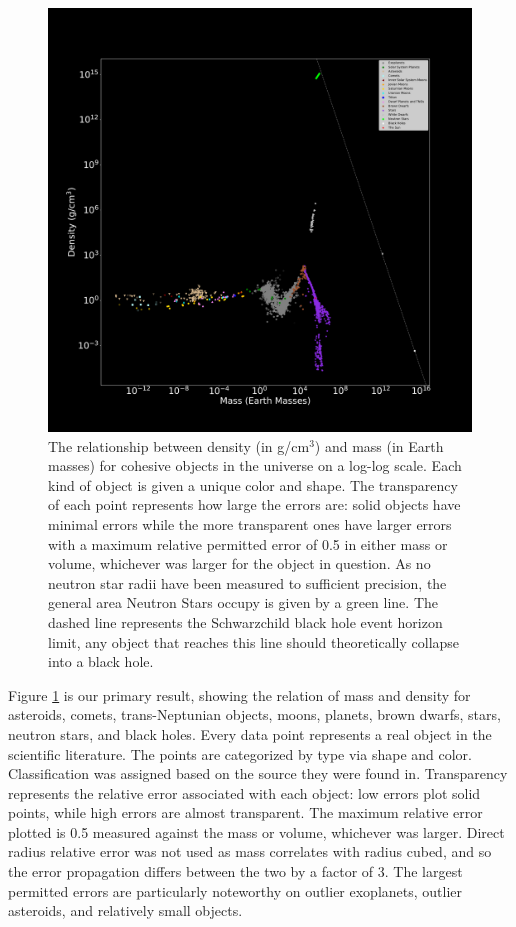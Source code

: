 \documentclass[twocolumn,linenumbers]{aastex631}
\begin{document}
\begin{figure}[htbp]
\centering
\includegraphics[scale = 0.35]{MassDensityPlot.pdf}
\centering
\caption{The relationship between density (in g/cm$^3$) and mass (in Earth masses) for cohesive objects in the universe on a log-log scale. Each kind of object is given a unique color and shape. The transparency of each point represents how large the errors are: solid objects have minimal errors while the more transparent ones have larger errors with a maximum relative permitted error of 0.5 in either mass or volume, whichever was larger for the object in question. As no neutron star radii have been measured to sufficient precision, the general area Neutron Stars occupy is given by a green line. The dashed line represents the Schwarzchild black hole event horizon limit, any object that reaches this line should theoretically collapse into a black hole.}
\label{fig:1}
\end{figure}

Figure \ref{fig:1} is our primary result, showing the relation of mass and density for asteroids, comets, trans-Neptunian objects, moons, planets, brown dwarfs, stars, neutron stars, and black holes. Every data point represents a real object in the scientific literature. The points are categorized by type via shape and color. Classification was assigned based on the source they were found in. Transparency represents the relative error associated with each object: low errors plot solid points, while high errors are almost transparent. The maximum relative error plotted is 0.5 measured against the mass or volume, whichever was larger. Direct radius relative error was not used as mass correlates with radius cubed, and so the error propagation differs between the two by a factor of 3. The largest permitted errors are particularly noteworthy on outlier exoplanets, outlier asteroids, and relatively small objects. 
\end{document}
